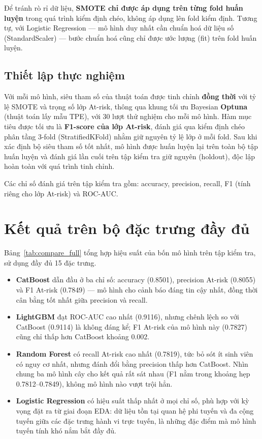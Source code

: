 \documentclass[a4paper]{article}
\newcommand{\code}[1]{{\ttfamily\def\_{\textunderscore\discretionary{}{}{}}#1}}
\def\code#1{#1}%
\def\_{ }%
\begin{document}
Để tránh rò rỉ dữ liệu, \textbf{SMOTE chỉ được áp dụng trên từng fold huấn
luyện} trong quá trình kiểm định chéo, không áp dụng lên fold kiểm định. Tương
tự, với Logistic Regression --- mô hình duy nhất cần chuẩn hoá dữ liệu số
(\code{StandardScaler}) --- bước chuẩn hoá cũng chỉ được ước lượng (fit) trên
fold huấn luyện.

\subsection{Thiết lập thực nghiệm}

Với mỗi mô hình, siêu tham số của thuật toán được tinh chỉnh \textbf{đồng thời}
với tỷ lệ SMOTE và trọng số lớp At-risk, thông qua khung tối ưu Bayesian
\textbf{Optuna} (thuật toán lấy mẫu TPE), với 30 lượt thử nghiệm cho mỗi mô
hình. Hàm mục tiêu được tối ưu là \textbf{F1-score của lớp At-risk}, đánh giá
qua kiểm định chéo phân tầng 3-fold (StratifiedKFold) nhằm giữ nguyên tỷ lệ
lớp ở mỗi fold. Sau khi xác định bộ siêu tham số tốt nhất, mô hình được huấn
luyện lại trên toàn bộ tập huấn luyện và đánh giá lần cuối trên tập kiểm tra
giữ nguyên (holdout), độc lập hoàn toàn với quá trình tinh chỉnh.

Các chỉ số đánh giá trên tập kiểm tra gồm: accuracy, precision, recall, F1
(tính riêng cho lớp At-risk) và ROC-AUC.

\section{Kết quả trên bộ đặc trưng đầy đủ}

Bảng~\ref{tab:compare_full} tổng hợp hiệu suất của bốn mô hình trên tập kiểm
tra, sử dụng đầy đủ 15 đặc trưng.



\begin{itemize}[leftmargin=*]
  \item \textbf{CatBoost} dẫn đầu ở ba chỉ số: accuracy (0.8501), precision
        At-risk (0.8055) và F1 At-risk (0.7849) --- mô hình cho cảnh báo đáng
        tin cậy nhất, đồng thời cân bằng tốt nhất giữa precision và recall.
  \item \textbf{LightGBM} đạt ROC-AUC cao nhất (0.9116), nhưng chênh lệch so
        với CatBoost (0.9114) là không đáng kể; F1 At-risk của mô hình này
        (0.7827) cũng chỉ thấp hơn CatBoost khoảng 0.002.
  \item \textbf{Random Forest} có recall At-risk cao nhất (0.7819), tức bỏ sót
        ít sinh viên có nguy cơ nhất, nhưng đánh đổi bằng precision thấp hơn
        CatBoost. Nhìn chung ba mô hình cây cho kết quả rất sát nhau (F1 nằm
        trong khoảng hẹp 0.7812--0.7849), không mô hình nào vượt trội hẳn.
  \item \textbf{Logistic Regression} có hiệu suất thấp nhất ở mọi chỉ số, phù
        hợp với kỳ vọng đặt ra từ giai đoạn EDA: dữ liệu tồn tại quan hệ phi
        tuyến và đa cộng tuyến giữa các đặc trưng hành vi trực tuyến, là những
        đặc điểm mà mô hình tuyến tính khó nắm bắt đầy đủ.
\end{itemize}
\end{document}
